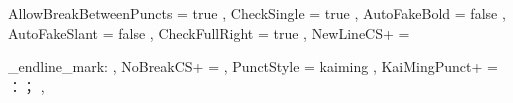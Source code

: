 \xeCJKsetup
  {
	  AllowBreakBetweenPuncts = true ,
	  CheckSingle             = true ,
	  AutoFakeBold            = false ,
	  AutoFakeSlant           = false ,
	  CheckFullRight          = true ,
	  NewLineCS+              = \mxendarticle \item \mnitem
	                            \maoxuan_endline_mark: , %
	  NoBreakCS+              = \mnote ,
	  PunctStyle              = kaiming ,
	  KaiMingPunct+           = ：； ,
  }
